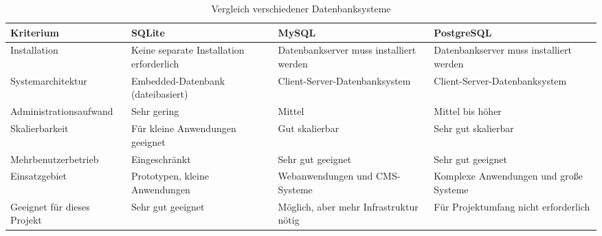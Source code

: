 \begin{table}[htbp]
\centering
\small
\begin{tabularx}{\textwidth}{lXXX}
\toprule
Kriterium & SQLite & MySQL & PostgreSQL \\
\midrule
Installation
& Keine separate Installation erforderlich
& Datenbankserver muss installiert werden
& Datenbankserver muss installiert werden \\

Systemarchitektur
& Embedded-Datenbank (dateibasiert)
& Client-Server-Datenbanksystem
& Client-Server-Datenbanksystem \\

Administrationsaufwand
& Sehr gering
& Mittel
& Mittel bis höher \\

Skalierbarkeit
& Für kleine Anwendungen geeignet
& Gut skalierbar
& Sehr gut skalierbar \\

Mehrbenutzerbetrieb
& Eingeschränkt
& Sehr gut geeignet
& Sehr gut geeignet \\

Einsatzgebiet
& Prototypen, kleine Anwendungen
& Webanwendungen und CMS-Systeme
& Komplexe Anwendungen und große Systeme \\

Geeignet für dieses Projekt
& Sehr gut geeignet
& Möglich, aber mehr Infrastruktur nötig
& Für Projektumfang nicht erforderlich \\
\bottomrule
\end{tabularx}
\caption{Vergleich verschiedener Datenbanksysteme}
\label{tab:dbvergleich}
\end{table}
